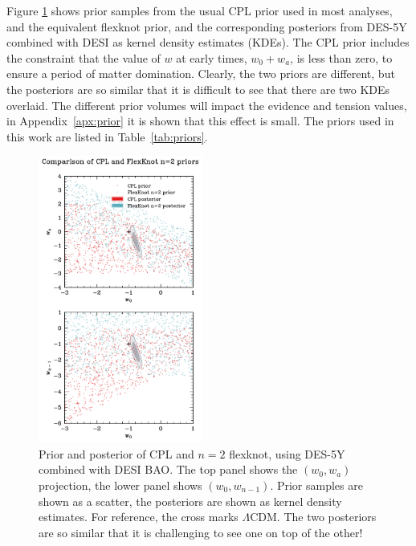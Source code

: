 \documentclass[fleqn,usenatbib]{mnras}
\newcommand{\lcdm}{$\Lambda$CDM}
\begin{document}
    Figure \ref{fig:prior} shows prior samples from the usual CPL prior used in most analyses, and the equivalent flexknot prior, and the corresponding posteriors from DES-5Y combined with DESI as kernel density estimates (KDEs).
    The CPL prior includes the constraint that the value of $w$ at early times, $w_0+w_a$, is less than zero, to ensure a period of matter domination.
    Clearly, the two priors are different, but the posteriors are so similar that it is difficult to see that there are two KDEs overlaid.
    The different prior volumes will impact the evidence and tension values, in Appendix~\ref{apx:prior} it is shown that this effect is small.
    The priors used in this work are listed in Table~\ref{tab:priors}.

    \begin{figure}
        \begin{center}
            \includegraphics[width=0.48\textwidth]{plots/cplprior.pdf}
        \end{center}
        \caption{
            Prior and posterior of CPL and $n=2$ flexknot, using DES-5Y combined with DESI BAO.
            The top panel shows the $(w_0, w_a)$ projection, the lower panel shows $(w_0, w_{n-1})$.
            Prior samples are shown as a scatter, the posteriors are shown as kernel density estimates.
            For reference, the cross marks \lcdm{}.
            The two posteriors are so similar that it is challenging to see one on top of the other!
        }\label{fig:prior}
    \end{figure}
\end{document}
